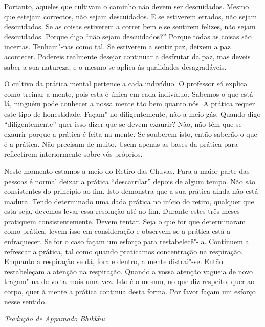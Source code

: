 Portanto, aqueles que cultivam o caminho não devem ser descuidados.
Mesmo que estejam correctos, não sejam descuidados. E se estiverem
errados, não sejam descuidados. Se as coisas estiverem a correr bem e se
sentirem felizes, não sejam descuidados. Porque digo ``não sejam
descuidados?'' Porque todas as coisas são incertas. Tenham"-nas como tal.
Se estiverem a sentir paz, deixem a paz acontecer. Podereis realmente
desejar continuar a desfrutar da paz, mas deveis saber a sua natureza; e
o mesmo se aplica às qualidades desagradáveis.

O cultivo da prática mental pertence a cada indivíduo. O professor só
explica como treinar a mente, pois esta é única em cada indivíduo.
Sabemos o que está lá, ninguém pode conhecer a nossa mente tão bem
quanto nós. A prática requer este tipo de honestidade. Façam"-no
diligentemente, não a meio gás. Quando digo ``diligentemente'' quer isso
dizer que se devem exaurir? Não, não têm que se exaurir porque a prática
é feita na mente. Se souberem isto, então saberão o que é a prática. Não
precisam de muito. Usem apenas as bases da prática para reflectirem
interiormente sobre vós próprios.

Neste momento estamos a meio do Retiro das Chuvas. Para a maior parte
das pessoas é normal deixar a prática ``descarrilar'' depois de algum
tempo. Não são consistentes do princípio ao fim. Isto demonstra que a
sua prática ainda não está madura. Tendo determinado uma dada prática no
início do retiro, qualquer que esta seja, devemos levar essa resolução
até ao fim. Durante estes três meses pratiquem consistentemente. Devem
tentar. Seja o que for que determinaram como prática, levem isso em
consideração e observem se a prática está a enfraquecer. Se for o caso
façam um esforço para restabelecê"-la. Continuem a refrescar a prática,
tal como quando praticamos concentração na respiração. Enquanto a
respiração se dá, fora e dentro, a mente distrai"-se. Então restabeleçam
a atenção na respiração. Quando a vossa atenção vagueia de novo
tragam"-na de volta mais uma vez. Isto é o mesmo, no que diz respeito,
quer ao corpo, quer à mente a prática continua desta forma. Por favor
façam um esforço nesse sentido.

\bigskip

{\raggedleft\itshape
  Tradução de Appamādo Bhikkhu
\par}
